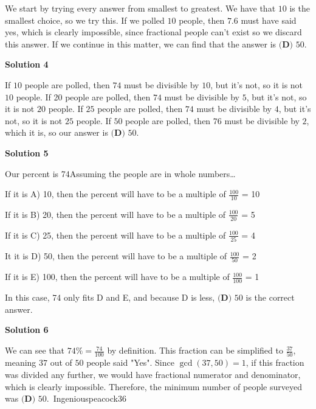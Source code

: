 \begin{enumerate}
We start by trying every answer from smallest to greatest. We have that $10$ is the smallest choice, so we try this. If we polled $10$ people, then $7.6$ must have said yes, which is clearly impossible, since fractional people can't exist so we discard this answer. If we continue in this matter, we can find that the answer is $\boxed{ \textbf{(D) }50}$. 

 



\textbf{Solution 4}

If $10$ people are polled, then $74$ must be divisible by $10$, but it's not, so it is not $10$ people. If 20 people are polled, then $74$ must be divisible by $5$, but it's not, so it is not $20$ people. If $25$ people are polled, then $74$ must be divisible by $4$, but it's not, so it is not $25$ people. If $50$ people are polled, then $76$ must be divisible by $2$, which it is, so our answer is $\boxed{ \textbf{(D) }50}$. 

 



\textbf{Solution 5}

Our percent is 74Assuming the people are in whole numbers\ldots

 If it is A) 10, then the percent will have to be a multiple of $\frac{100}{10}$ = 10

 If it is B) 20, then the percent will have to be a multiple of $\frac {100}{20}$ = 5

 If it is C) 25, then the percent will have to be a multiple of $\frac {100}{25}$ = 4

 It it is D) 50, then the percent will have to be a multiple of $\frac {100}{50}$ = 2

 If it is E) 100, then the percent will have to be a multiple of $\frac {100}{100}$ = 1

 In this case, 74 only fits D and E, and because D is less, $\boxed{ \textbf{(D) }50}$ is the correct answer.

 



\textbf{Solution 6}

We can see that $74 \% = \frac{74}{100}$ by definition. This fraction can be simplified to $\frac{37}{50}$, meaning $37$ out of $50$ people said "Yes". Since $\gcd(37,50) = 1$, if this fraction was divided any further, we would have fractional numerator and denominator, which is clearly impossible. Therefore, the minimum number of people surveyed was $\boxed{ \textbf{(D) } 50}$.~Ingeniouspeacock36


\end{enumerate}
